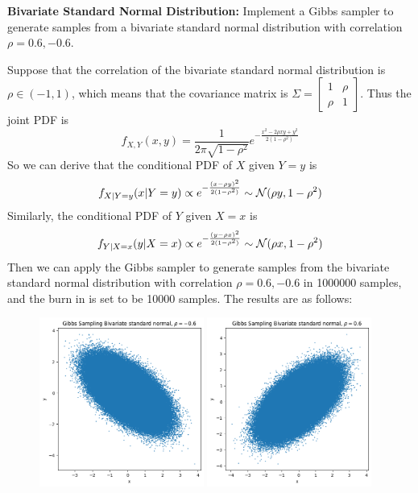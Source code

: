 \begin{homeworkProblem}

\textbf{Bivariate Standard Normal Distribution:} Implement a Gibbs sampler to generate samples from a bivariate standard normal distribution with correlation $\rho=0.6,-0.6$.

\solution

Suppose that the correlation of the bivariate standard normal distribution is $\rho\in(-1,1)$, which means that the covariance matrix is $\Sigma=\begin{bmatrix}
    1 & \rho \\
    \rho & 1
\end{bmatrix}$. Thus the joint PDF is
$$f_{X,Y}(x,y)=\dfrac{1}{2\pi\sqrt{1-\rho^2}}e^{-\frac{x^2-2\rho xy+y^2}{2(1-\rho^2)}}$$
So we can derive that the conditional PDF of $X$ given $Y=y$ is
$$f_{X|Y=y}(x|Y=y)\propto e^{-\frac{(x-\rho y)^2}{2(1-\rho^2)}}\sim\mathcal{N}(\rho y,1-\rho^2)$$
Similarly, the conditional PDF of $Y$ given $X=x$ is
$$f_{Y|X=x}(y|X=x)\propto e^{-\frac{(y-\rho x)^2}{2(1-\rho^2)}}\sim\mathcal{N}(\rho x,1-\rho^2)$$
Then we can apply the Gibbs sampler to generate samples from the bivariate standard normal distribution with correlation $\rho=0.6,-0.6$ in 1000000 samples, and the burn in is set to be 10000 samples. The results are as follows:

\begin{figure}[h]
    \centering
    \includegraphics[width=0.48\textwidth]{./figure/p7/-0.6.png}
    \includegraphics[width=0.48\textwidth]{./figure/p7/0.6.png}
\end{figure}

\end{homeworkProblem}

\newpage